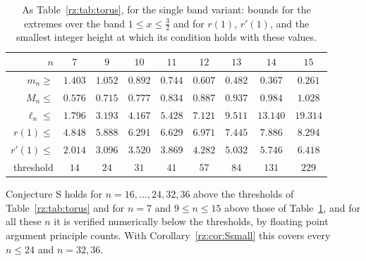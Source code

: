 \begin{table}[htbp]
\centering
\small
\begin{tabular}{rcccccccc}
\toprule
$n$ & $7$ & $9$ & $10$ & $11$ & $12$ & $13$ & $14$ & $15$\\
\midrule
$m_n\ge$ & $1.403$ & $1.052$ & $0.892$ & $0.744$ & $0.607$ & $0.482$ & $0.367$ & $0.261$\\
$M_n\le$ & $0.576$ & $0.715$ & $0.777$ & $0.834$ & $0.887$ & $0.937$ & $0.984$ & $1.028$\\
$\ell_n\le$ & $1.796$ & $3.193$ & $4.167$ & $5.428$ & $7.121$ & $9.511$ & $13.140$ & $19.314$\\
$r(1)\le$ & $4.848$ & $5.888$ & $6.291$ & $6.629$ & $6.971$ & $7.445$ & $7.886$ & $8.294$\\
$r'(1)\le$ & $2.014$ & $3.096$ & $3.520$ & $3.869$ & $4.282$ & $5.032$ & $5.746$ & $6.418$\\
threshold & $14$ & $24$ & $31$ & $41$ & $57$ & $84$ & $131$ & $229$\\
\bottomrule
\end{tabular}
\caption{As Table~\ref{rz:tab:torus}, for the single band variant: bounds for the extremes over the band $1\le x\le\frac32$ and for $r(1)$, $r'(1)$, and the smallest integer height at which its condition holds with these values.}
\label{rz:tab:torus1}
\end{table}

\begin{corollary}\label{rz:cor:Storus}
Conjecture S holds for $n=16,\dots,24,32,36$ above the thresholds of Table~\ref{rz:tab:torus} and for $n=7$ and $9\le n\le15$ above those of Table~\ref{rz:tab:torus1}, and for all these $n$ it is verified numerically below the thresholds, by floating point argument principle counts. With Corollary~\ref{rz:cor:Ssmall} this covers every $n\le24$ and $n=32,36$.
\end{corollary}

